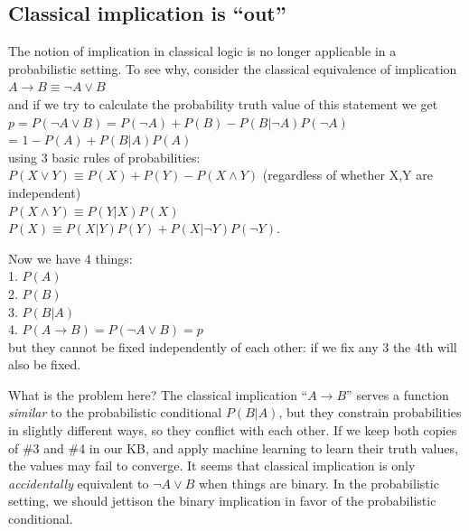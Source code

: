 \subsection{Classical implication is ``out''}
The notion of implication in classical logic is no longer applicable in a probabilistic setting.  To see why, consider the classical equivalence of implication\\
\hspace*{1cm} $ A \rightarrow B \equiv \neg A \vee B $\\
and if we try to calculate the probability truth value of this statement we get\\
\hspace*{1cm} $ p = P( \neg A \vee B ) = P(\neg A) + P(B) - P(B|\neg A) P(\neg A) $\\
\hspace*{1cm} = $ 1 - P(A) + P(B|A) P(A) $\\
using 3 basic rules of probabilities:\\
\hspace*{1cm} $ P(X \vee Y) \equiv P(X) + P(Y) - P(X \wedge Y) $  (regardless of whether X,Y are independent)\\
\hspace*{1cm} $ P(X \wedge Y) \equiv P(Y|X)P(X) $\\
\hspace*{1cm} $ P(X) \equiv P(X|Y)P(Y) + P(X|\neg Y)P(\neg Y) $.

Now we have 4 things:\\
\hspace*{1cm} 1.  $ P(A) $\\
\hspace*{1cm} 2.  $ P(B) $\\
\hspace*{1cm} 3.  $ P(B|A) $\\
\hspace*{1cm} 4.  $ P(A \rightarrow B) = P(\neg A \vee B) = p $\\
but they cannot be fixed independently of each other: if we fix any 3 the 4th will also be fixed.

What is the problem here?  The classical implication ``$A \rightarrow B$'' serves a function \textit{similar} to the probabilistic conditional $P(B|A)$, but they constrain probabilities in slightly different ways, so they conflict with each other.  If we keep both copies of \#3 and \#4 in our KB, and apply machine learning to learn their truth values, the values may fail to converge.  It seems that classical implication is only \emph{accidentally} equivalent to $\neg A \vee B$ when things are binary.  In the probabilistic setting, we should jettison the binary implication in favor of the probabilistic conditional.

